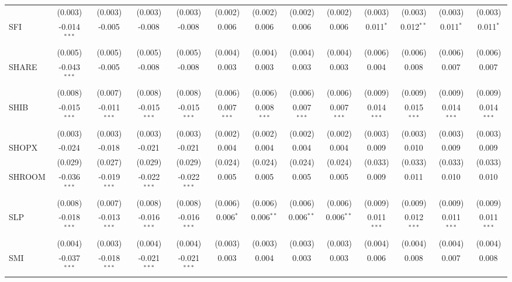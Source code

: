 \begin{table}[!htbp]
\begin{tabular}{@{\extracolsep{5pt}}lcccccccccccc}
  & (0.003) & (0.003) & (0.003) & (0.003) & (0.002) & (0.002) & (0.002) & (0.002) & (0.003) & (0.003) & (0.003) & (0.003) \\
 SFI & -0.014$^{***}$ & -0.005$^{}$ & -0.008$^{}$ & -0.008$^{}$ & 0.006$^{}$ & 0.006$^{}$ & 0.006$^{}$ & 0.006$^{}$ & 0.011$^{*}$ & 0.012$^{**}$ & 0.011$^{*}$ & 0.011$^{*}$ \\
  & (0.005) & (0.005) & (0.005) & (0.005) & (0.004) & (0.004) & (0.004) & (0.004) & (0.006) & (0.006) & (0.006) & (0.006) \\
 SHARE & -0.043$^{***}$ & -0.005$^{}$ & -0.008$^{}$ & -0.008$^{}$ & 0.003$^{}$ & 0.003$^{}$ & 0.003$^{}$ & 0.003$^{}$ & 0.004$^{}$ & 0.008$^{}$ & 0.007$^{}$ & 0.007$^{}$ \\
  & (0.008) & (0.007) & (0.008) & (0.008) & (0.006) & (0.006) & (0.006) & (0.006) & (0.009) & (0.009) & (0.009) & (0.009) \\
 SHIB & -0.015$^{***}$ & -0.011$^{***}$ & -0.015$^{***}$ & -0.015$^{***}$ & 0.007$^{***}$ & 0.008$^{***}$ & 0.007$^{***}$ & 0.007$^{***}$ & 0.014$^{***}$ & 0.015$^{***}$ & 0.014$^{***}$ & 0.014$^{***}$ \\
  & (0.003) & (0.003) & (0.003) & (0.003) & (0.002) & (0.002) & (0.002) & (0.002) & (0.003) & (0.003) & (0.003) & (0.003) \\
 SHOPX & -0.024$^{}$ & -0.018$^{}$ & -0.021$^{}$ & -0.021$^{}$ & 0.004$^{}$ & 0.004$^{}$ & 0.004$^{}$ & 0.004$^{}$ & 0.009$^{}$ & 0.010$^{}$ & 0.009$^{}$ & 0.009$^{}$ \\
  & (0.029) & (0.027) & (0.029) & (0.029) & (0.024) & (0.024) & (0.024) & (0.024) & (0.033) & (0.033) & (0.033) & (0.033) \\
 SHROOM & -0.036$^{***}$ & -0.019$^{***}$ & -0.022$^{***}$ & -0.022$^{***}$ & 0.005$^{}$ & 0.005$^{}$ & 0.005$^{}$ & 0.005$^{}$ & 0.009$^{}$ & 0.011$^{}$ & 0.010$^{}$ & 0.010$^{}$ \\
  & (0.008) & (0.007) & (0.008) & (0.008) & (0.006) & (0.006) & (0.006) & (0.006) & (0.009) & (0.009) & (0.009) & (0.009) \\
 SLP & -0.018$^{***}$ & -0.013$^{***}$ & -0.016$^{***}$ & -0.016$^{***}$ & 0.006$^{*}$ & 0.006$^{**}$ & 0.006$^{**}$ & 0.006$^{**}$ & 0.011$^{***}$ & 0.012$^{***}$ & 0.011$^{***}$ & 0.011$^{***}$ \\
  & (0.004) & (0.003) & (0.004) & (0.004) & (0.003) & (0.003) & (0.003) & (0.003) & (0.004) & (0.004) & (0.004) & (0.004) \\
 SMI & -0.037$^{***}$ & -0.018$^{***}$ & -0.021$^{***}$ & -0.021$^{***}$ & 0.003$^{}$ & 0.004$^{}$ & 0.003$^{}$ & 0.003$^{}$ & 0.006$^{}$ & 0.008$^{}$ & 0.007$^{}$ & 0.008$^{}$ \\

\end{tabular}
\end{table}
